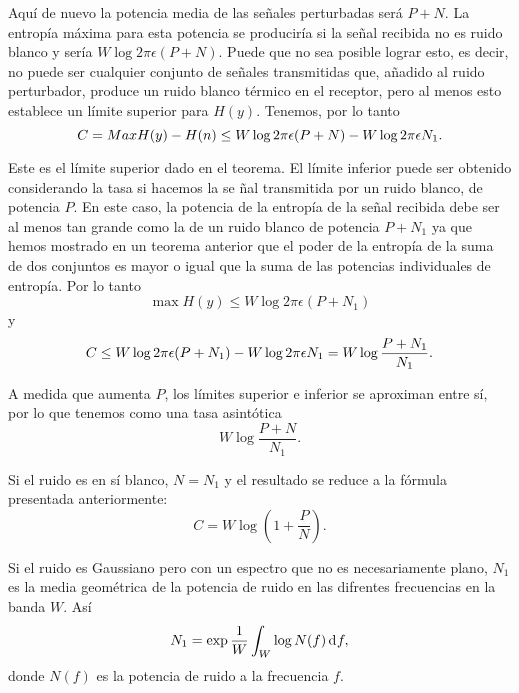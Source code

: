 Aqu\'i de nuevo la potencia media de las se\~nales perturbadas ser\'a
$P+N$. La entrop\'ia m\'axima para esta potencia se producir\'ia si la
se\~nal recibida no es ruido blanco y ser\'ia $W\log 2\pi \epsilon
(P+N)$.  Puede que no sea posible lograr esto, es decir, no puede ser
cualquier conjunto de se\~nales transmitidas que, a\~nadido al ruido
perturbador, produce un ruido blanco t\'ermico en el receptor, pero al
menos esto establece un l\'imite superior para $H(y)$.  Tenemos, por
lo tanto
\begin{equation}
C = Max H(y) - H(n)\bigskip
\leq W\log 2\pi\epsilon (P+N) - W\log 2\pi \epsilon N_{1}.
\end{equation}
	
Este es el l\'imite superior dado en el teorema. El l\'imite inferior
puede ser obtenido considerando la tasa si hacemos la se \~nal
transmitida por un ruido blanco, de potencia $P$. En este caso, la
potencia de la entrop\'ia de la se\~nal recibida debe ser al menos tan
grande como la de un ruido blanco de potencia $P + N_{1}$ ya que hemos
mostrado en un teorema anterior que el poder de la entrop\'ia de la
suma de dos conjuntos es mayor o igual que la suma de las potencias
individuales de entrop\'ia. Por lo tanto
\begin{equation}
\max H(y) \leq W\log 2\pi \epsilon(P+N_{1})
\end{equation}
y
\begin{equation}
C \leq W\log 2\pi \epsilon (P + N_{1}) - W\log 2 \pi \epsilon N_{1} \bigskip
= W\log \frac{P+N_{1}}{N_{1}}.
\end{equation}
	
A medida que aumenta $P$, los l\'imites superior e inferior se aproximan
entre s\'i, por lo que tenemos como una tasa asint\'otica
\begin{equation}
W\log \frac{P+N}{N_{1}}.
\end{equation}
	
Si el ruido es en s\'i blanco, $N = N_{1}$ y el resultado se reduce a
la f\'ormula presentada anteriormente:
\begin{equation}
C = W\log (1 + \frac{P}{N}).
\end{equation}
	
Si el ruido es Gaussiano pero con un espectro que no es necesariamente
plano, $N_{1}$ es la media geom\'etrica de la potencia de
ruido en las difrentes frecuencias en la banda $W$. As\'i
\begin{equation}
N_{1} = \exp \frac{1}{W} \int_W \log N(f) \diff f,
\end{equation}
donde $N(f)$ es la potencia de ruido a la frecuencia $f$.

